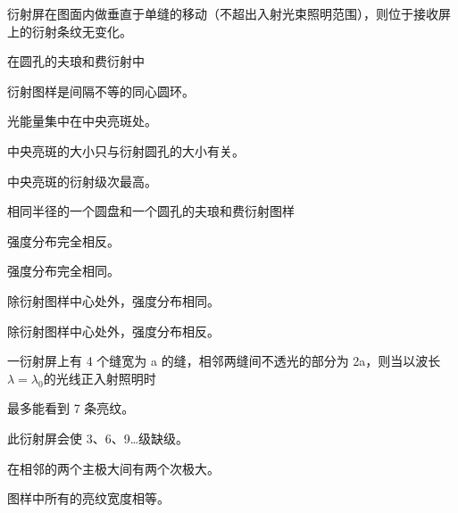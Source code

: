 \documentclass[standard, analysis, notocnum]{ExBook}
\newcommand{\answerarea}[1][8cm]{%
  \par\vspace{2mm}%
  \noindent{\color{themeColor!35}\rule{\linewidth}{0.4pt}}\par
  \noindent\begin{minipage}[t][#1][t]{\linewidth}\vspace{0pt}\end{minipage}\par
  \noindent{\color{themeColor!35}\rule{\linewidth}{0.4pt}}\par
}
\begin{document}
\begin{qitems}
\begin{bbox}
\par\noindent\hspace{2em}衍射屏在图面内做垂直于单缝的移动（不超出入射光束照明范围），则位于接收屏上的衍射条纹无变化。
\answerarea[3.5cm]
\end{bbox}
\begin{bbox}
\qitem 在圆孔的夫琅和费衍射中
\par\noindent\hspace{2em}衍射图样是间隔不等的同心圆环。
\par\noindent\hspace{2em}光能量集中在中央亮斑处。
\par\noindent\hspace{2em}中央亮斑的大小只与衍射圆孔的大小有关。
\par\noindent\hspace{2em}中央亮斑的衍射级次最高。
\answerarea[3.5cm]
\end{bbox}
\begin{bbox}
\qitem 相同半径的一个圆盘和一个圆孔的夫琅和费衍射图样
\par\noindent\hspace{2em}强度分布完全相反。
\par\noindent\hspace{2em}强度分布完全相同。
\par\noindent\hspace{2em}除衍射图样中心处外，强度分布相同。
\par\noindent\hspace{2em}除衍射图样中心处外，强度分布相反。
\answerarea[3.5cm]
\end{bbox}
\begin{bbox}
\qitem 一衍射屏上有 4 个缝宽为 a 的缝，相邻两缝间不透光的部分为 2a，则当以波长$\lambda =\lambda_{0}$的光线正入射照明时
\par\noindent\hspace{2em}最多能看到 7 条亮纹。
\par\noindent\hspace{2em}此衍射屏会使 3、6、9…级缺级。
\par\noindent\hspace{2em}在相邻的两个主极大间有两个次极大。
\par\noindent\hspace{2em}图样中所有的亮纹宽度相等。
\answerarea[3.5cm]
\end{bbox}

\end{qitems}
\end{document}
